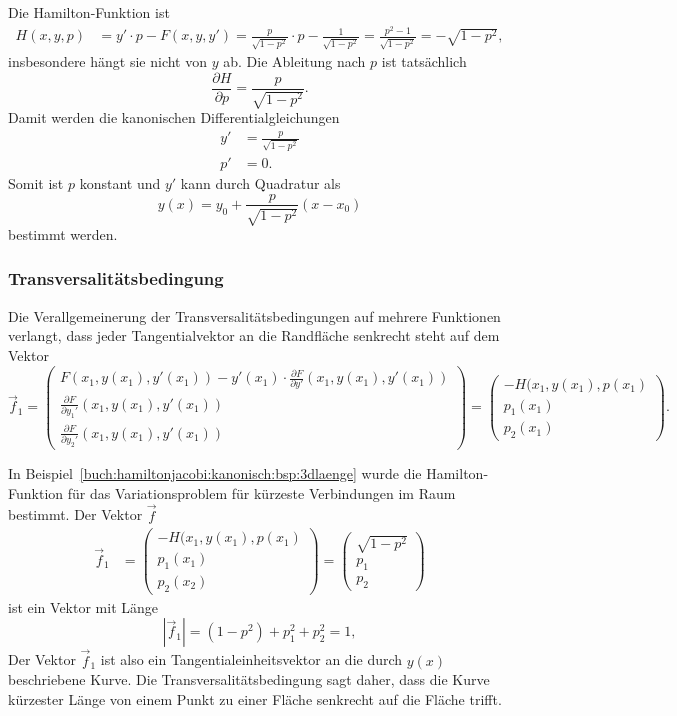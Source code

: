 \begin{beispiel}
Die Hamilton-Funktion ist
\begin{align*}
H(x,y,p)
&=
y'\cdot p - F(x,y,y')
=
\frac{p}{\sqrt{1-p^2}}\cdot p - \frac{1}{\sqrt{1-p^2}}
=
\frac{p^2-1}{\sqrt{1-p^2}}
=
-\sqrt{1-p^2},
\end{align*}
insbesondere hängt sie nicht von $y$ ab.
Die Ableitung nach $p$ ist tatsächlich
\begin{equation}
\frac{\partial H}{\partial p}
=
\frac{p}{\sqrt{1-p^2}}.
\label{buch:hamiltonjacobi:kanonisch:bsp:dHdp}
\end{equation}
Damit werden die kanonischen Differentialgleichungen
\begin{align*}
y' &= \frac{p}{\sqrt{1-p^2}} \\
p' &= 0.
\end{align*}
Somit ist $p$ konstant und $y'$ kann durch Quadratur als
\[
y(x)
=
y_0 + \frac{p}{\sqrt{1-p^2}}(x-x_0)
\]
bestimmt werden.
\end{beispiel}

%
%
\subsubsection{Transversalitätsbedingung}
Die Verallgemeinerung der Transversalitätsbedingungen auf mehrere
Funktionen verlangt, dass jeder Tangentialvektor an die Randfläche
senkrecht steht auf dem Vektor
\[
\vec{f}_1
=
\begin{pmatrix}
\displaystyle
F(x_1,y(x_1),y'(x_1))
-
y'(x_1)\cdot \frac{\partial F}{\partial y'}(x_1,y(x_1),y'(x_1))
\\
\displaystyle
\frac{\partial F}{\partial y_1'}(x_1,y(x_1),y'(x_1))
\\[9pt]
\displaystyle
\frac{\partial F}{\partial y_2'}(x_1,y(x_1),y'(x_1))
\end{pmatrix}
=
\begin{pmatrix}
-H(x_1,y(x_1),p(x_1)\\
p_1(x_1)\\
p_2(x_1)
\end{pmatrix}.
\]

\begin{beispiel}
In Beispiel~\ref{buch:hamiltonjacobi:kanonisch:bsp:3dlaenge} wurde
die Hamilton-Funktion für das Variationsproblem für kürzeste Verbindungen
im Raum bestimmt.
Der Vektor $\vec{f}$ 
\begin{align*}
\vec{f}_1
&=
\begin{pmatrix}
-H(x_1,y(x_1),p(x_1)\\
p_1(x_1)\\
p_2(x_2)
\end{pmatrix}
=
\begin{pmatrix}
\sqrt{1-p^2}\\
p_1\\
p_2
\end{pmatrix}
\end{align*}
ist ein Vektor mit Länge
\[
|\vec{f}_1|
=
(1-p^2) + p_1^2+p_2^2
=
1,
\]
Der Vektor $\vec{f}_1$ ist also ein Tangentialeinheitsvektor an die
durch $y(x)$ beschriebene Kurve.
Die Transversalitätsbedingung sagt daher, dass die Kurve kürzester
Länge von einem Punkt zu einer Fläche senkrecht auf die Fläche trifft.
\end{beispiel}

